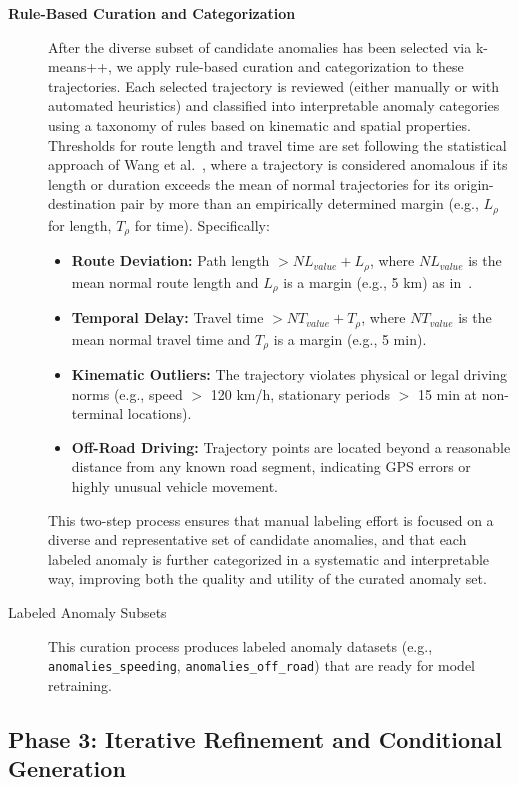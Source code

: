 \documentclass[runningheads]{llncs}
\begin{document}
\begin{description}
    \item[\textbf{Rule-Based Curation and Categorization}] After the diverse subset of candidate anomalies has been selected via k-means++, we apply rule-based curation and categorization to these trajectories. Each selected trajectory is reviewed (either manually or with automated heuristics) and classified into interpretable anomaly categories using a taxonomy of rules based on kinematic and spatial properties. Thresholds for route length and travel time are set following the statistical approach of Wang et al.~\cite{wangStatisticalFrameworkTaxi2020,wangDetectingAnomalousTrajectories2018}, where a trajectory is considered anomalous if its length or duration exceeds the mean of normal trajectories for its origin-destination pair by more than an empirically determined margin (e.g., $L_\rho$ for length, $T_\rho$ for time). Specifically:
        \begin{itemize}[leftmargin=*]
            \item \textbf{Route Deviation:} Path length $> NL_{value} + L_\rho$, where $NL_{value}$ is the mean normal route length and $L_\rho$ is a margin (e.g., 5 km) as in~\cite{wangDetectingAnomalousTrajectories2018}.
            \item \textbf{Temporal Delay:} Travel time $> NT_{value} + T_\rho$, where $NT_{value}$ is the mean normal travel time and $T_\rho$ is a margin (e.g., 5 min).
            \item \textbf{Kinematic Outliers:} The trajectory violates physical or legal driving norms (e.g., speed $>$ 120 km/h, stationary periods $>$ 15 min at non-terminal locations).
            \item \textbf{Off-Road Driving:} Trajectory points are located beyond a reasonable distance from any known road segment, indicating GPS errors or highly unusual vehicle movement.
        \end{itemize}
    This two-step process ensures that manual labeling effort is focused on a diverse and representative set of candidate anomalies, and that each labeled anomaly is further categorized in a systematic and interpretable way, improving both the quality and utility of the curated anomaly set.
    \item[Labeled Anomaly Subsets] This curation process produces labeled anomaly datasets (e.g., \texttt{anomalies\_speeding}, \texttt{anomalies\_off\_road}) that are ready for model retraining.
\end{description}

\subsection{Phase 3: Iterative Refinement and Conditional Generation}
\label{sec:iterative-refinement}
\end{document}
